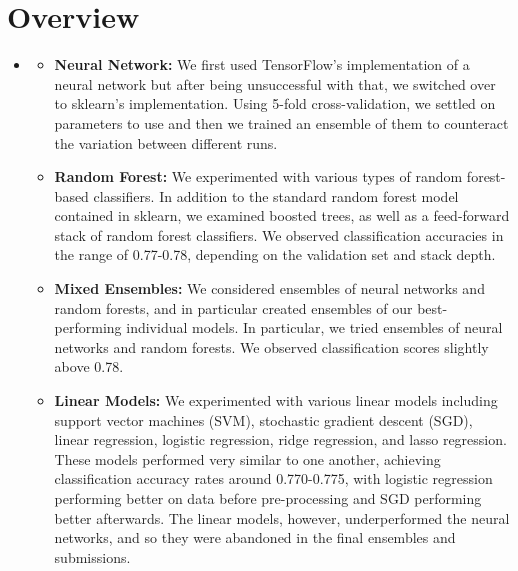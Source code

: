 \section{Overview}
\medskip
\begin{itemize}

    \item {}
    \begin{itemize}
    \item \textbf{Neural Network:} We first used TensorFlow's implementation of a neural network but after being unsuccessful with that, we switched over to sklearn's implementation. Using 5-fold cross-validation, we settled on parameters to use and then we trained an ensemble of them to counteract the variation between different runs.

    \item \textbf{Random Forest:} We experimented with various types of random forest-based classifiers. In addition to the standard random forest model contained in sklearn, we examined boosted trees, as well as a feed-forward stack of random forest classifiers. We observed classification accuracies in the range of 0.77-0.78, depending on the validation set and stack depth.

    \item \textbf{Mixed Ensembles:} We considered ensembles of neural networks and random forests, and in particular created ensembles of our best-performing individual models. In particular, we tried ensembles of neural networks and random forests. We observed classification scores slightly above 0.78.

    \item \textbf{Linear Models:} We experimented with various linear models including support vector machines (SVM), stochastic gradient descent (SGD), linear regression, logistic regression, ridge regression, and lasso regression. These models performed very similar to one another, achieving classification accuracy rates around 0.770-0.775, with logistic regression performing better on data before pre-processing and SGD performing better afterwards. The linear models, however, underperformed the neural networks, and so they were abandoned in the final ensembles and submissions.

    \end{itemize}


\end{itemize}

